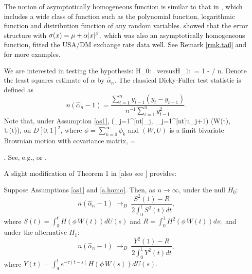 \begin{rem}
The notion of asymptotically homogeneous function is similar to that in \citet[][\citeyear{parkphillips2001}]{parkphillips1999}, which includes a wide class of function such as  the polynomial function, logarithmic function and distribution function of any random variables.  \cite{park2002} showed that the error structure with $\sigma(x) = \mu + \alpha |x|^\beta$, which was also an asymptotically homogeneous function, fitted the USA/DM exchange rate data well. See Remark \ref{rmk.tail} and \cite{parkphillips1999} for more examples.
\end{rem}
 We are interested in testing the hypothesis: \be H_0:\ \quad
\mbox{versus}\quad H_1:\ \alpha = 1 - \tau / n.  \ee Denote the
least squares estimate of $\alpha$ by $\widehat \alpha_n$. The classical Dicky-Fuller test statistic is defined as
\begin{equation}\label{eqn42} n(\widehat \alpha_n - 1)
=  \frac{\sum_{t = 1}^n y_{t-1} (y_{t} - y_{t-1}) }{ n^{-1}
\sum_{t=1}^n y_{t-1}^2 }. \end{equation}
Note that, under Assumption \ref{as1},
\be  {}
\big(\sum_{j=1}^{[nt]}\xi_j,\ \sum_{j=1}^{[nt]}u_{j+1}\big) \Rightarrow (W(t), U(t)),
\ee
on $D[0,1]^2$,
where $\phi=\sum_{k=0}^{\infty}\phi_k$ and  $(W,U)$ is a limit bivariate Brownian motion with covariance matrix,
\be {}
\Delta = .
\ee
See, e.g., \cite{phillipsdurlauf1986} or \cite{phillipssolo1992}.

A slight modification  of Theorem 1 in \cite{cavalieretaylor2009} [also see \cite{hansen1995}] provides:

\begin{thm}\label{thm.NNHUnitRoot} Suppose Assumptions \ref{as1} and \ref{a.homo}. Then, as $n\to\infty$, under the null $H_0$:
\begin{equation}\label{th21.eqn1} n(\widehat \alpha_n - 1) \ \to_D\ \frac{S^2(1) - R} { 2 \int_{0}^{1} S^2(t) dt },  \end{equation}
 where
$
S(t) = \int_{0}^{t} H(\phi\, W(t)) dU(s)$ and $R = \int_{0}^{1} H^2(\phi\,W(t)) ds;$ and under the alternative $H_1$:
\begin{equation}\label{th21.eqn2} n(\widehat \alpha_n - 1) \ \to_D\ \frac{Y^2(1) - R}
{ 2 \int_{0}^{1} Y^2(t) dt },  \end{equation}
 where
$
Y(t) = \int_{0}^{t} e^{-\tau (t - s)} H(\phi\, W(s)) dU(s).
$
\end{thm}

